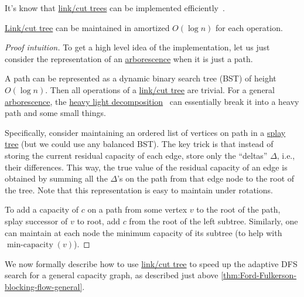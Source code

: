 It's know that \hyperref[def:link-cut-tree]{link/cut trees} can be implemented efficiently~\cite{shiloach1978n,galil1980eviog2v,sleator1981nm,sleator1981data,dominic1983data}.

\begin{theorem}\label{thm:link-cut-tree}
	\hyperref[def:link-cut-tree]{Link/cut tree} can be maintained in amortized \(O(\log n)\) for each operation.
\end{theorem}
\begin{proof}[Proof intuition]
	To get a high level idea of the implementation, let us just consider the representation of an \hyperref[def:arborescence]{arborescence} when it is just a path.

	\begin{intuition}
		A path can be represented as a dynamic binary search tree (BST) of height \(O(\log n)\). Then all operations of a \hyperref[def:link-cut-tree]{link/cut tree} are trivial. For a general \hyperref[def:arborescence]{arborescence}, the \href{https://en.wikipedia.org/wiki/Heavy-light_decomposition}{heavy light decomposition}~\cite{dominic1983data} can essentially break it into a heavy path and some small things.
	\end{intuition}

	Specifically, consider maintaining an ordered list of vertices on path in a \href{https://en.wikipedia.org/wiki/Splay_tree}{splay tree} (but we could use any balanced BST). The key trick is that instead of storing the current residual capacity of each edge, store only the ``deltas'' \(\Delta \), i.e., their differences. This way, the true value of the residual capacity of an edge is obtained by summing all the \(\Delta \)'s on the path from that edge node to the root of the tree. Note that this representation is easy to maintain under rotations.

	To add a capacity of \(c\) on a path from some vertex \(v\) to the root of the path, splay successor of \(v\) to root, add \(c\) from the root of the left subtree. Similarly, one can maintain at each node the minimum capacity of its subtree (to help with \(\operatorname{min-capacity}(v) \)).
\end{proof}

We now formally describe how to use \hyperref[def:link-cut-tree]{link/cut tree} to speed up the adaptive DFS search for a general capacity graph, as described just above \autoref{thm:Ford-Fulkerson-blocking-flow-general}.

